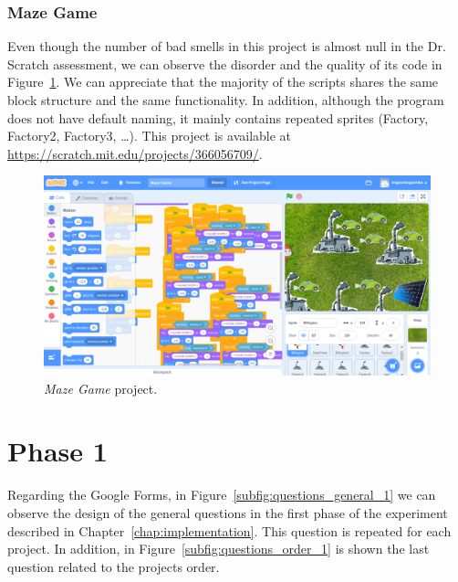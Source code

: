 \subsubsection{Maze Game}
\label{subsubsec:maze_game}

Even though the number of bad smells in this project is almost null in the Dr. Scratch assessment, we can observe the disorder and the quality of its code in Figure~\ref{fig:maze_game}. We can appreciate that the majority of the scripts shares the same block structure and the same functionality. In addition, although the program does not have default naming, it mainly contains repeated sprites (Factory, Factory2, Factory3, \ldots). This project is available at \url{https://scratch.mit.edu/projects/366056709/}.  

 \begin{figure}
    \centering
    \includegraphics[width=13cm,                         keepaspectratio]{img/maze_game.png}
    \caption{\textit{Maze Game} project.}
    \label{fig:maze_game}
\end{figure}



\section{Phase 1}
\label{app:phase_1}

Regarding the Google Forms, in Figure~\ref{subfig:questions_general_1} we can observe the design of the general questions in the first phase of the experiment described in Chapter~\ref{chap:implementation}. This question is repeated for each project. In addition, in Figure~\ref{subfig:questions_order_1} is shown the last question related to the projects order. 

